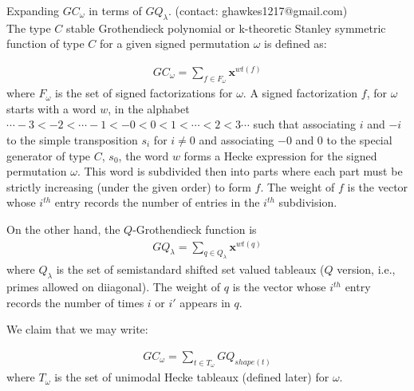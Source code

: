 \documentclass[]{amsart}
\theoremstyle{definition}
\begin{document}








\noindent Expanding $GC_{\omega}$ in terms of $GQ_{\lambda}$.  (contact: ghawkes1217@gmail.com)\\


The type $C$ stable Grothendieck polynomial or k-theoretic Stanley symmetric function of type $C$ for a given signed permutation $\omega$ is defined as:

\begin{eqnarray*}
GC_{\omega}=\sum_{f  \in F_{\omega}} \mathbf{x}^{wt(f)}
\end{eqnarray*}
where $F_{\omega}$ is the set of signed factorizations for $\omega$.  A signed factorization $f$, for $\omega$ starts with a word $w$, in the alphabet $\cdots-3<-2<\cdots-1<-0<0<1<\cdots<2<3\cdots$ such that associating $i$ and $-i$ to the simple transposition $s_i$ for $i \neq 0$ and associating $-0$ and $0$ to the special generator of type $C$, $s_0$, the word $w$ forms a Hecke expression for the signed permutation $\omega$. This word is subdivided then into parts where each part must be strictly increasing (under the given order) to form $f$.  The weight of $f$ is the vector whose $i^{th}$ entry records the number of entries in the $i^{th}$ subdivision. 

On the other hand, the $Q$-Grothendieck function is
\begin{eqnarray*}
GQ_{\lambda}=\sum_{q \in Q_{\lambda}} \mathbf{x}^{wt(q)}
\end{eqnarray*}
 where $Q_{\lambda}$ is the set of semistandard shifted set valued tableaux ($Q$ version, i.e., primes allowed on diiagonal).  The weight of $q$ is the vector whose $i^{th}$ entry records the number of times $i$ or $i'$ appears in $q$.  


We claim that we may write:


\begin{eqnarray*}
GC_{\omega}=\sum_{t  \in T_{\omega}} GQ_{shape(t)}
\end{eqnarray*}
where $T_{\omega}$ is the set of unimodal Hecke tableaux (defined later) for $\omega$.
\end{document}
